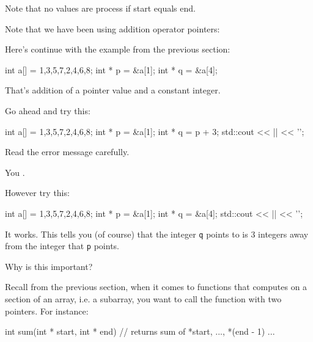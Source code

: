 Note that no values are process if start equals end.








\newpage{}

Note that we have been using addition operator pointers:

Here's continue with the example from the previous section:

\begin{consolethree}[escapeinside=||]
int a[] = {1,3,5,7,2,4,6,8};
int * p = &a[1];
int * q = &a[4];
\end{consolethree}

That's addition of a pointer value and a constant integer.

Go ahead and try this:

\begin{consolethree}[escapeinside=||]
int a[] = {1,3,5,7,2,4,6,8};
int * p = &a[1];
int * q = p + 3;
std::cout << || << '\n';
\end{consolethree}

Read the error message carefully.

You .

However try this:

\begin{consolethree}[escapeinside=||]
int a[] = {1,3,5,7,2,4,6,8};
int * p = &a[1];
int * q = &a[4];
std::cout << || << '\n';
\end{consolethree}

It works. This tells you (of course) that the integer \texttt{q} points to is 3 integers away from the integer that \texttt{p} points.

Why is this important?

Recall from the previous section, when it comes to functions that computes on a section of an array, i.e. a subarray, you want to call the function with two pointers. For instance:

\begin{consolethree}[escapeinside=||]
int sum(int * start, int * end)
{
    // returns sum of *start, ..., *(end - 1)
    ...
}
\end{consolethree}

